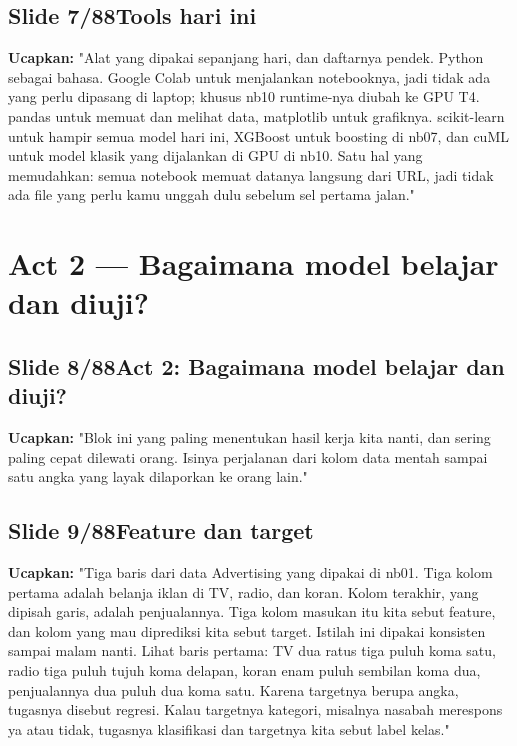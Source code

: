 \documentclass[11pt]{article}
\renewcommand{\framebox}[1]{\colorbox{acc!15}{\textcolor{acc}{\textbf{#1}}}}
\begin{document}
\subsection*{\framebox{Slide 7/88}\quad Tools hari ini}
\textbf{Ucapkan:} "Alat yang dipakai sepanjang hari, dan daftarnya pendek. Python sebagai bahasa. Google Colab untuk menjalankan notebooknya, jadi tidak ada yang perlu dipasang di laptop; khusus nb10 runtime-nya diubah ke GPU T4. pandas untuk memuat dan melihat data, matplotlib untuk grafiknya. scikit-learn untuk hampir semua model hari ini, XGBoost untuk boosting di nb07, dan cuML untuk model klasik yang dijalankan di GPU di nb10. Satu hal yang memudahkan: semua notebook memuat datanya langsung dari URL, jadi tidak ada file yang perlu kamu unggah dulu sebelum sel pertama jalan."\\[2pt]

\section{Act 2 — Bagaimana model belajar dan diuji?}

\subsection*{\framebox{Slide 8/88}\quad Act 2: Bagaimana model belajar dan diuji?}
\textbf{Ucapkan:} "Blok ini yang paling menentukan hasil kerja kita nanti, dan sering paling cepat dilewati orang. Isinya perjalanan dari kolom data mentah sampai satu angka yang layak dilaporkan ke orang lain."\\[2pt]

\subsection*{\framebox{Slide 9/88}\quad Feature dan target}
\textbf{Ucapkan:} "Tiga baris dari data Advertising yang dipakai di nb01. Tiga kolom pertama adalah belanja iklan di TV, radio, dan koran. Kolom terakhir, yang dipisah garis, adalah penjualannya. Tiga kolom masukan itu kita sebut feature, dan kolom yang mau diprediksi kita sebut target. Istilah ini dipakai konsisten sampai malam nanti. Lihat baris pertama: TV dua ratus tiga puluh koma satu, radio tiga puluh tujuh koma delapan, koran enam puluh sembilan koma dua, penjualannya dua puluh dua koma satu. Karena targetnya berupa angka, tugasnya disebut regresi. Kalau targetnya kategori, misalnya nasabah merespons ya atau tidak, tugasnya klasifikasi dan targetnya kita sebut label kelas."\\[2pt]
\end{document}
